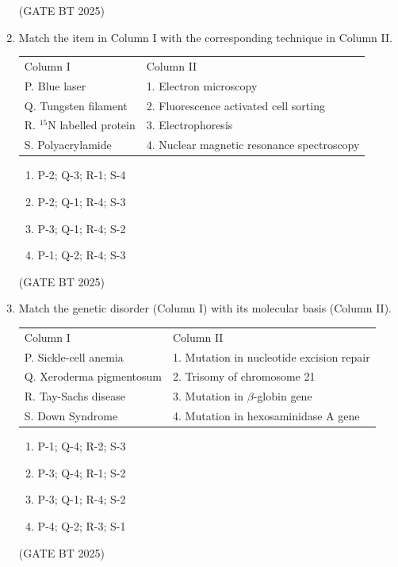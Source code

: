 \documentclass[journal,12pt,onecolumn]{IEEEtran}
\theoremstyle{remark}
\begin{document}
\begin{enumerate}
\hfill (GATE BT 2025)

\item Match the item in Column I with the corresponding technique in Column II.

\begin{tabular}{ll}
Column I & Column II \\
P. Blue laser & 1. Electron microscopy \\
Q. Tungsten filament & 2. Fluorescence activated cell sorting \\
R. $^{15}$N labelled protein & 3. Electrophoresis \\
S. Polyacrylamide & 4. Nuclear magnetic resonance spectroscopy \\
\end{tabular}

\begin{enumerate}
\item P-2; Q-3; R-1; S-4 \hfill
\item P-2; Q-1; R-4; S-3 \hfill
\item P-3; Q-1; R-4; S-2 \hfill
\item P-1; Q-2; R-4; S-3
\end{enumerate}

\hfill (GATE BT 2025)

\item Match the genetic disorder (Column I) with its molecular basis (Column II).

\begin{tabular}{ll}
Column I & Column II \\
P. Sickle-cell anemia & 1. Mutation in nucleotide excision repair \\
Q. Xeroderma pigmentosum & 2. Trisomy of chromosome 21 \\
R. Tay-Sachs disease & 3. Mutation in $\beta$-globin gene \\
S. Down Syndrome & 4. Mutation in hexosaminidase A gene \\
\end{tabular}

\begin{enumerate}
\item P-1; Q-4; R-2; S-3 \hfill
\item P-3; Q-4; R-1; S-2 \hfill
\item P-3; Q-1; R-4; S-2 \hfill
\item P-4; Q-2; R-3; S-1
\end{enumerate}

\hfill (GATE BT 2025)


\end{enumerate}
\end{document}
